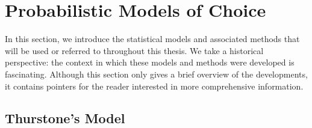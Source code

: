 \section{Probabilistic Models of Choice}
\label{in:sec:models}

In this section, we introduce the statistical models and associated methods that will be used or referred to throughout this thesis.
We take a historical perspective: the context in which these models and methods were developed is fascinating.
Although this section only gives a brief overview of the developments, it contains pointers for the reader interested in more comprehensive information.

\subsection{Thurstone's Model}
\label{in:sec:thurstone}


